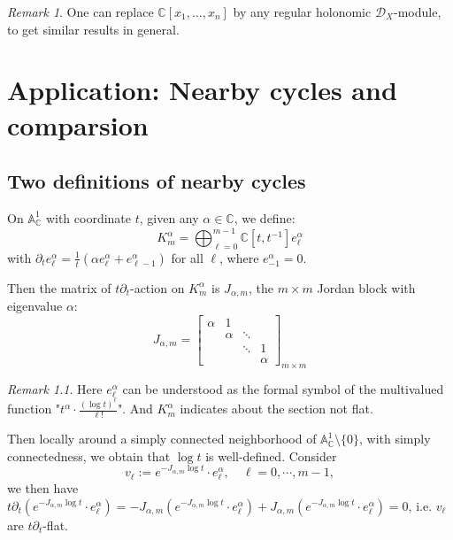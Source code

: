 \documentclass[openany]{book}
\theoremstyle{definition} %
\theoremstyle{remark}
\newtheorem{remark}{Remark}[chapter] %
\begin{document}
\begin{remark}
    One can replace $\mathbb{C}[x_1, \ldots, x_n]$ by any regular holonomic $\mathcal{D}_X$-module, to get similar results in general.
\end{remark}


\chapter{Application: Nearby cycles and comparsion}

\section{Two definitions of nearby cycles}
On $\mathbb{A}_{\mathbb{C}}^1$ with coordinate $t$, given any $\alpha \in \mathbb{C}$, we define: $$K_m^{\alpha} = \bigoplus_{\ell=0}^{m-1} \mathbb{C}[t, t^{-1}] e_\ell^{\alpha}$$ with $\partial_t e_\ell^{\alpha} = \frac{1}{t}(\alpha e_\ell^{\alpha} + e_{\ell-1}^{\alpha})$ for all $\ell$, where $e_{-1}^{\alpha} = 0$.

Then the matrix of $t\partial_t$-action on $K_m^{\alpha}$ is $J_{\alpha,m}$, the $m\times m$ Jordan block with eigenvalue $\alpha$:$$J_{\alpha,m} = \begin{bmatrix}
        \alpha & 1      &        &        \\
               & \alpha & \ddots &        \\
               &        & \ddots & 1      \\
               &        &        & \alpha
    \end{bmatrix}_{m \times m}$$

\begin{remark}
    Here $e_\ell^{\alpha}$ can be understood as the formal symbol of the multivalued function "$t^{\alpha} \cdot \frac{(\log t)^\ell}{\ell!}$". And $K^\alpha_{m}$ indicates about the section not flat.
\end{remark}

Then locally around a simply connected neighborhood of $\mathbb{A}_{\mathbb{C}}^1 \setminus \{0\}$, with simply connectedness, we obtain that $\mathrm{\log}t$ is well-defined. Consider $$v_{\ell} := e^{-J_{\alpha,m} \log t} \cdot e_{\ell}^{\alpha}, \quad \ell = 0, \cdots, m-1,$$we then have  $t\partial_t \left(e^{-J_{\alpha,m} \log t} \cdot e_{\ell}^{\alpha}\right) = -J_{\alpha,m} \left(e^{-J_{\alpha,m} \log t} \cdot e_{\ell}^{\alpha}\right) + J_{\alpha,m} \left(e^{-J_{\alpha,m} \log t} \cdot e_{\ell}^{\alpha}\right) = 0$, i.e. $v_{\ell}$ are $t\partial_t$-flat.
\end{document}
